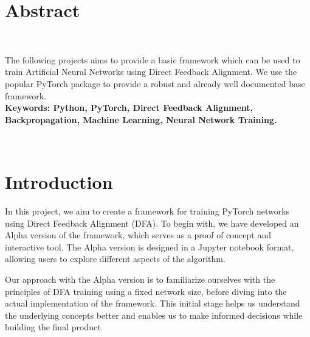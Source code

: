 \documentclass[english]{article}
\begin{document}
\section*{\centering \textbf{Abstract}}

\begin{center}
  \hrulefill\\[0.2cm]
  \begin{minipage}{0.9\textwidth}
      \centering
        The following projects aims to provide a basic framework which can be used to train Artificial Neural Networks using Direct Feedback Alignment. We use the popular PyTorch package to provide a robust and already well documented base framework. \\
      \textbf{Keywords: Python, PyTorch, Direct Feedback Alignment, Backpropagation, Machine Learning, Neural Network Training.}

  \end{minipage}\\[0.2cm]
  \hrulefill
\end{center}



\section{Introduction}


In this project, we aim to create a framework for training PyTorch networks using Direct Feedback Alignment (DFA). To begin with, we have developed an Alpha version of the framework, which serves as a proof of concept and interactive tool. The Alpha version is designed in a Jupyter notebook format, allowing users to explore different aspects of the algorithm.

Our approach with the Alpha version is to familiarize ourselves with the principles of DFA training using a fixed network size, before diving into the actual implementation of the framework. This initial stage helps us understand the underlying concepts better and enables us to make informed decisions while building the final product.
\end{document}
